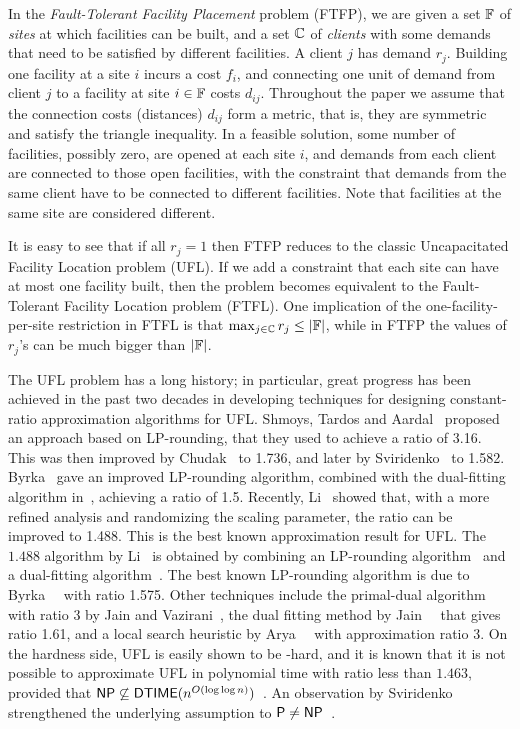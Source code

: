 \documentclass[11pt]{article}
\begin{document}
In the \emph{Fault-Tolerant Facility Placement} problem
(FTFP), we are given a set $\mathbb{F}$ of \emph{sites} at
which facilities can be built, and a set $\mathbb{C}$ of
\emph{clients} with some demands that need to be satisfied
by different facilities. A client $j$ has demand
$r_j$. Building one facility at a site $i$ incurs a cost
$f_i$, and connecting one unit of demand from client $j$ to
a facility at site $i\in\mathbb{F}$ costs $d_{ij}$. Throughout the
paper we assume that the connection costs (distances)
$d_{ij}$ form a metric, that is, they are
symmetric and satisfy the triangle inequality. In a feasible solution, some
number of facilities, possibly zero, are opened at each site
$i$, and demands from each client are connected to those
open facilities, with the constraint that demands from the
same client have to be connected to different
facilities. Note that facilities at the same site are considered different.

It is easy to see that if all $r_j=1$ then FTFP reduces to
the classic Uncapacitated Facility Location problem (UFL).
If we add a constraint that each site can have at most one
facility built, then the problem becomes equivalent to the
Fault-Tolerant Facility Location problem (FTFL). One
implication of the one-facility-per-site restriction in FTFL
is that $\max_{j\in\mathbb{C}}r_j \leq |\mathbb{F}|$, while
in FTFP the values of $r_j$'s can be much bigger than
$|\mathbb{F}|$.

The UFL problem has a long history; in particular, great
progress has been achieved in the past two decades in
developing techniques for designing constant-ratio
approximation algorithms for UFL.  Shmoys, Tardos and
Aardal~\cite{ShmoysTA97} proposed an approach based on
LP-rounding, that they used to achieve a ratio of 3.16.
This was then improved by Chudak~\cite{ChudakS04} to 1.736,
and later by Sviridenko~\cite{Svi02} to 1.582.
Byrka~\cite{ByrkaA10} gave an improved LP-rounding
algorithm, combined with the dual-fitting algorithm
in~\cite{JainMMSV03}, achieving a ratio of 1.5.  Recently,
Li~\cite{Li11} showed that, with a more refined analysis and
randomizing the scaling parameter, the ratio can be improved
to 1.488. This is the best known approximation result for
UFL. The $1.488$ algorithm by Li~\cite{Li11} is obtained by
combining an LP-rounding algorithm~\cite{ByrkaGS10} and a
dual-fitting algorithm~\cite{JainMMSV03}. The best known
LP-rounding algorithm is due to
Byrka~{\etal}~\cite{ByrkaGS10} with ratio 1.575. Other
techniques include the primal-dual algorithm with ratio 3 by
Jain and Vazirani~\cite{JainV01}, the dual fitting method by
Jain~{\etal}~\cite{JainMMSV03} that gives ratio 1.61, and a
local search heuristic by Arya~{\etal}~\cite{AryaGKMMP04}
with approximation ratio 3.  On the hardness side, UFL is
easily shown to be {\NP}-hard, and it is known that it is
not possible to approximate UFL in polynomial time with
ratio less than $1.463$, provided that
${\mbox{\sf NP}}\not\subseteq{\mbox{\sf DTIME}}(n^{O(\log\log
  n)})$~\cite{GuhaK98}. An observation by Sviridenko
strengthened the underlying assumption to ${\mbox{\sf P}}\neq
{\mbox{\sf NP}}$~\cite{vygen05}.
\end{document}
